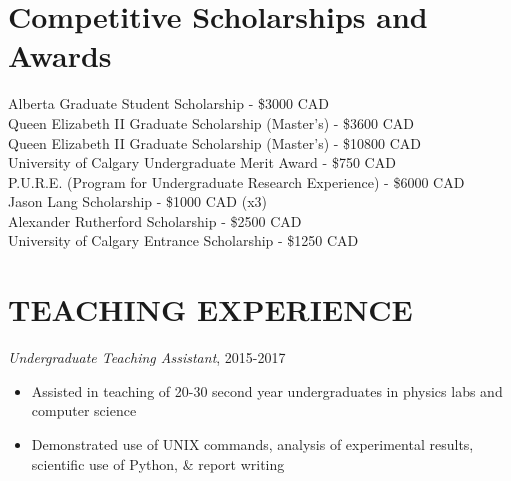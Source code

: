 \documentclass[letter, margin, 10pt]{res} %
\begin{document}
\begin{resume}
\section{Competitive Scholarships and Awards}
\vspace{4pt}
Alberta Graduate Student Scholarship - \$3000 CAD\hfill{}\\
Queen Elizabeth II Graduate Scholarship (Master's) - \$3600 CAD\hfill{}\\
Queen Elizabeth II Graduate Scholarship (Master's) - \$10800 CAD\hfill{}\\
University of Calgary Undergraduate Merit Award - \$750 CAD\hfill{}\\
P.U.R.E. (Program for Undergraduate Research Experience) - \$6000 CAD\hfill{}\\
Jason Lang Scholarship - \$1000 CAD (x3)\hfill{}\\
Alexander Rutherford Scholarship - \$2500 CAD\hfill{}\\
University of Calgary Entrance Scholarship - \$1250 CAD\hfill{}
\section{TEACHING EXPERIENCE}

{\sl Undergraduate Teaching Assistant}, 2015-2017
\begin{itemize}[noitemsep,topsep=0pt,parsep=0pt,partopsep=0pt]
\item Assisted in teaching of 20-30 second year undergraduates in physics labs and computer science 
\item Demonstrated use of UNIX commands, analysis of experimental results, scientific use of Python, \& report writing
\end{itemize}



 





 

\end{resume}
\end{document}

